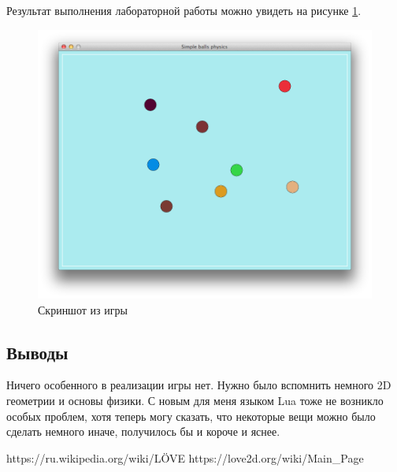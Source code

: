 \documentclass[12pt]{article}
\begin{document}
Результат выполнения лабораторной работы можно увидеть на рисунке \ref{fig:game}.

\begin{figure}[!htb]
  \centering
    \includegraphics[scale=0.5]{pics/game.png}
   \caption{Скриншот из игры}
    \label{fig:game}
\end{figure}

\subsection*{Выводы}
Ничего особенного в реализации игры нет. Нужно было вспомнить немного 2D геометрии и основы
физики. С новым для меня языком Lua тоже не возникло особых проблем, хотя теперь могу сказать,
что некоторые вещи можно было сделать немного иначе, получилось бы и короче и яснее.

\begin{thebibliography}{}
 https://ru.wikipedia.org/wiki/LÖVE
 https://love2d.org/wiki/Main\_Page
\end{thebibliography}
\end{document}
